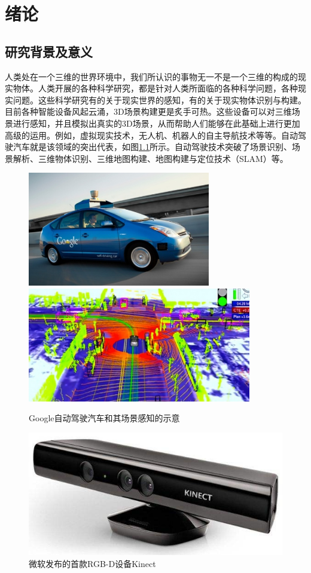 \chapter{绪论}
\section{研究背景及意义}
人类处在一个三维的世界环境中，我们所认识的事物无一不是一个三维的构成的现实物体。人类开展的各种科学研究，都是针对人类所面临的各种科学问题，各种现实问题。这些科学研究有的关于现实世界的感知，有的关于现实物体识别与构建。目前各种智能设备风起云涌，3D场景构建更是炙手可热。这些设备可以对三维场景进行感知，并且模拟出真实的3D场景，从而帮助人们能够在此基础上进行更加高级的运用。例如，虚拟现实技术，无人机、机器人的自主导航技术等等。自动驾驶汽车就是该领域的突出代表，如图\ref{fig_1-1}所示。自动驾驶技术突破了场景识别、场景解析、三维物体识别、三维地图构建、地图构建与定位技术（SLAM）等。

\begin{figure}[tb]
\begin{center}
\includegraphics[width=0.4\linewidth, height=5cm]{figures/1-1a.jpg} 
\includegraphics[width=0.4\linewidth, height=5cm]{figures/1-1b.jpg}
\end{center} 
\vspace{-4mm}
\caption{Google自动驾驶汽车和其场景感知的示意} \label{fig_1-1}
\end{figure}

\begin{figure}[tb]
\begin{center}
\includegraphics[width=0.4\linewidth]{figures/1-2.jpg} 
\end{center} 
\vspace{-4mm}
\caption{微软发布的首款RGB-D设备Kinect} \label{fig_1-2}
\end{figure}

